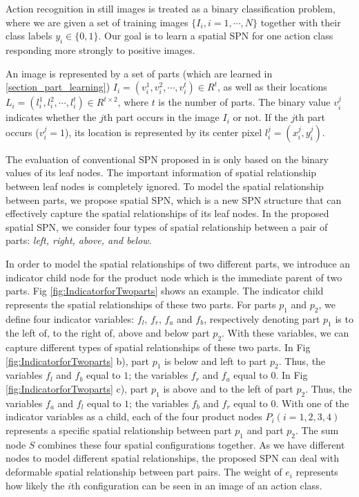 \documentclass[journal]{IEEEtran}
\begin{document}
Action recognition in still images is treated as a binary classification problem, where we are given a set of training images $  \{ I_i, i=1,\cdots, N \} $ together with their class labels $ y_i \in \{ 0,1 \} $. Our goal is to learn a spatial SPN for one action class responding more strongly to positive images.




An image is represented by a set of parts (which are learned in \ref{section_part_learning}) $ I_i = (v_i^1,v_i^2, \cdots, v_i^t) \in R^t $, as well as their locations $L_i=(l_i^1,l_i^2, \cdots , l_i^t) \in R^{t\times 2}$, where $ t $ is the number of parts. The binary value $ v_i^j $ indicates whether the $ j $th part occurs in the image $ I_i $ or not. If the $ j $th part occurs ($ v_i^j=1 $), its location is represented by its center pixel $ l_i^j=(x_i^j,y_i^j) $. 


The evaluation of conventional SPN proposed in \cite{poon2011SPNIntroduce} is only based on the binary values of its leaf nodes. The important information of spatial relationship between leaf nodes is completely ignored.
To model the spatial relationship between parts, we propose spatial SPN, which is a new SPN structure that can effectively capture the spatial relationships of its leaf nodes. In the proposed spatial SPN, we consider four types of spatial relationship between a pair of parts: \textit{left, right, above, and below}.





In order to model the spatial relationships of two different parts, we introduce an indicator child node for the product node which is the immediate parent of two parts. Fig \ref{fig:IndicatorforTwoparts} shows an example. The indicator child represents the spatial relationships of these two parts. For parts $ p_1 $ and $ p_2 $, we define four indicator variables: $ f_{l} $, $ f_r $, $ f_a $ and $ f_{b} $, respectively denoting part $ p_1 $ is to the left of, to the right of, above and below part $ p_2 $. With these variables, we can capture different types of spatial relationships of these two parts. In Fig \ref{fig:IndicatorforTwoparts} b), part $ p_1 $ is below and left to part $ p_2 $. Thus, the variables $ f_l $ and $ f_b $ equal to $ 1 $; the variables $ f_r $ and $ f_a $ equal to $ 0 $. In Fig \ref{fig:IndicatorforTwoparts} c), part $ p_1 $ is above and to the left of part $ p_2 $. Thus, the variables $ f_a $ and $ f_l $ equal to $ 1 $; the variables $ f_b $ and $ f_r $ equal to $ 0 $. With one of the indicator variables as a child, each of the four product nodes $ P_i(i=1,2,3,4) $ represents a specific spatial relationship between part $ p_1 $ and part $ p_2 $. The sum node $ S $ combines these four spatial configurations together. As we have different nodes to model different spatial relationships, the proposed SPN can deal with deformable spatial relationship between part pairs.
The weight of $ e_i $  represents how likely the $ i $th configuration can be seen in an image of an action class.
\end{document}
